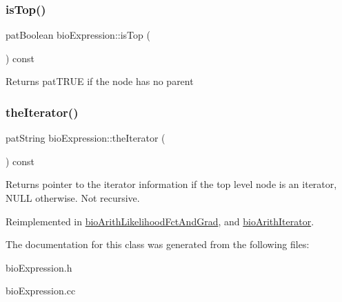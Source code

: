\mbox{\label{classbio_expression_a95a481610d93746accf6c294c4f4d5d4}} 
\subsubsection{\texorpdfstring{is\+Top()}{isTop()}}
{\footnotesize\ttfamily pat\+Boolean bio\+Expression\+::is\+Top (\begin{DoxyParamCaption}{ }\end{DoxyParamCaption}) const\hspace{0.3cm}{\ttfamily [virtual]}}

\begin{DoxyReturn}{Returns}
pat\+T\+R\+UE if the node has no parent 
\end{DoxyReturn}
\mbox{\label{classbio_expression_a9830c0cf012012c811b826adc54291f6}} 
\subsubsection{\texorpdfstring{the\+Iterator()}{theIterator()}}
{\footnotesize\ttfamily pat\+String bio\+Expression\+::the\+Iterator (\begin{DoxyParamCaption}{ }\end{DoxyParamCaption}) const\hspace{0.3cm}{\ttfamily [virtual]}}

\begin{DoxyReturn}{Returns}
pointer to the iterator information if the top level node is an iterator, N\+U\+LL otherwise. Not recursive. 
\end{DoxyReturn}


Reimplemented in \hyperlink{classbio_arith_likelihood_fct_and_grad_ab7df38cb82ae1a9b77d51445931e1ac9}{bio\+Arith\+Likelihood\+Fct\+And\+Grad}, and \hyperlink{classbio_arith_iterator_a0e3f7a50861a44e7a62216e5a192a838}{bio\+Arith\+Iterator}.



The documentation for this class was generated from the following files\+:\begin{DoxyCompactItemize}
\item 
bio\+Expression.\+h\item 
bio\+Expression.\+cc\end{DoxyCompactItemize}
